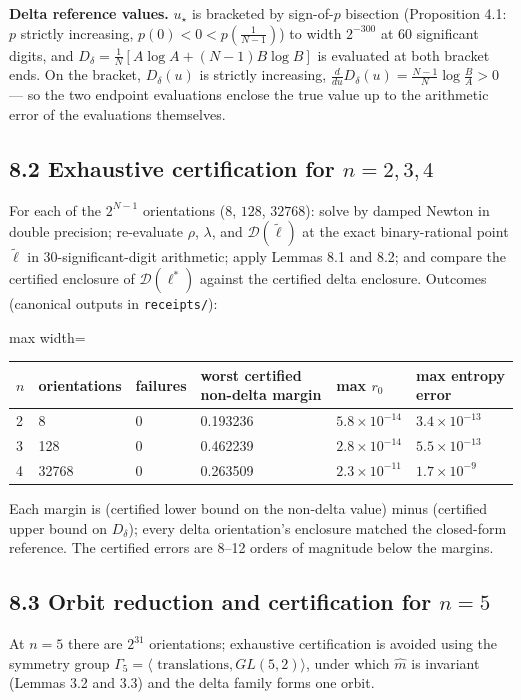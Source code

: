 \documentclass[11pt]{article}
\begin{document}
\textbf{Delta reference values.}  $u_\star$ is bracketed by sign-of-$p$ bisection (Proposition 4.1: $p$ strictly increasing, $p(0) < 0 < p(\tfrac1{N-1})$) to width $2^{-300}$ at 60 significant digits, and $D_\delta = \frac1N[A\log A + (N-1)B\log B]$ is evaluated at both bracket ends.  On the bracket, $D_\delta(u)$ is strictly increasing, $\frac{d}{du}D_\delta(u) = \frac{N-1}{N}\log\frac{B}{A} > 0$ — so the two endpoint evaluations enclose the true value up to the arithmetic error of the evaluations themselves.

\subsection*{8.2 Exhaustive certification for $n = 2, 3, 4$}
For each of the $2^{N-1}$ orientations ($8$, $128$, $32768$): solve by damped Newton in double precision; re-evaluate $\rho$, $\lambda$, and $\mathcal D(\tilde\ell)$ at the exact binary-rational point $\tilde\ell$ in 30-significant-digit arithmetic; apply Lemmas 8.1 and 8.2; and compare the certified enclosure of $\mathcal D(\ell^\ast)$ against the certified delta enclosure.  Outcomes (canonical outputs in \texttt{receipts/}):

\begin{center}
\begin{adjustbox}{max width=\textwidth}
\begin{tabular}{llllll}
$n$ & orientations & failures & worst certified non-delta margin & max $r_0$ & max entropy error \\
\hline
2 & 8 & 0 & 0.193236 & $5.8\times10^{-14}$ & $3.4\times10^{-13}$ \\
3 & 128 & 0 & 0.462239 & $2.8\times10^{-14}$ & $5.5\times10^{-13}$ \\
4 & 32768 & 0 & 0.263509 & $2.3\times10^{-11}$ & $1.7\times10^{-9}$ \\
\end{tabular}
\end{adjustbox}
\end{center}
Each margin is (certified lower bound on the non-delta value) minus (certified upper bound on $D_\delta$); every delta orientation's enclosure matched the closed-form reference.  The certified errors are 8–12 orders of magnitude below the margins.

\subsection*{8.3 Orbit reduction and certification for $n = 5$}
At $n = 5$ there are $2^{31}$ orientations; exhaustive certification is avoided using the symmetry group $\Gamma_5 = \langle\text{ translations}, GL(5,2)\rangle$, under which $\widehat m$ is invariant (Lemmas 3.2 and 3.3) and the delta family forms one orbit.
\end{document}
